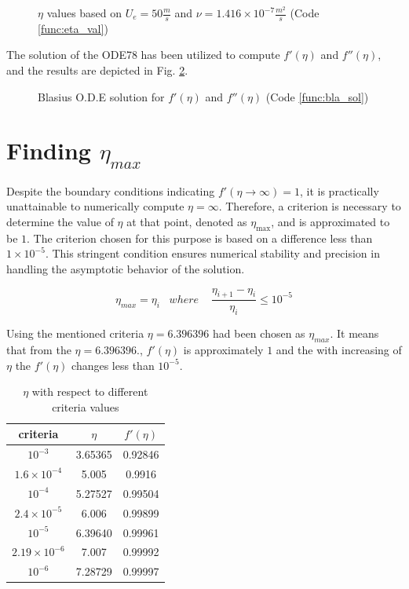 \documentclass[]{report}
\begin{document}
\begin{figure}
    \centering
    
    \caption{$\eta$ values based on $U_e = 50 \frac{m}{s}$ and $\nu = 1.416 \times 10^{-7} \frac{m^2}{s}$ (Code \ref{func:eta_val})} 
    \label{fig:eta_values}
\end{figure}

The solution of the ODE78 has been utilized to compute $f'(\eta)$ and $f''(\eta)$, and the results are depicted in Fig. \ref{fig:bla_solution}.

\begin{figure}
    \centering
    
    \caption{Blasius O.D.E solution for $f'(\eta)$ and $f''(\eta)$ (Code \ref{func:bla_sol})}
    \label{fig:bla_solution}
\end{figure}

\section{Finding $\eta_{max}$ }


Despite the boundary conditions indicating $f'(\eta \rightarrow \infty) = 1$, it is practically unattainable to numerically compute $\eta = \infty$. Therefore, a criterion is necessary to determine the value of $\eta$ at that point, denoted as $\eta_{\text{max}}$, and is approximated to be $1$. The criterion chosen for this purpose is based on a difference less than $1 \times 10^{-5}$. This stringent condition ensures numerical stability and precision in handling the asymptotic behavior of the solution.

\begin{equation}
    \eta_{max} =\eta_i \;\;\; where \;\;\;\; \frac{\eta_{i+1} - \eta_{i}}{\eta_i} \le 10^{-5}
\end{equation}

Using the mentioned criteria $\eta = 6.396396$ had been chosen as $\eta_{max}$. It means that from the $\eta = 6.396396$., $f'(\eta)$ is approximately $1$ and the with increasing of $\eta$ the $f'(\eta)$ changes less than $10^{-5}$.

\begin{table}[h]
\centering
\caption{$\eta$ with respect to different criteria values}
\label{tab:eta_max}
\begin{tabular}{|c|c|c|}
\hline
criteria & $\eta$  & $f'(\eta)$    \\ \hline
$10^{-3}$  & 3.65365 & 0.92846 \\ \hline
$1.6\times10^{-4}$ & 5.005 & 0.9916 \\ \hline
$10^{-4}$  & 5.27527 & 0.99504 \\ \hline
$2.4\times 10^{-5}$ & 6.006& 0.99899 \\ \hline 
$10^{-5}$  & 6.39640 & 0.99961 \\\hline
$2.19\times 10^{-6}$ & 7.007 & 0.99992 \\ \hline
$10^{-6}$  & 7.28729 & 0.99997 \\ \hline
\end{tabular}
\end{table}
\end{document}
